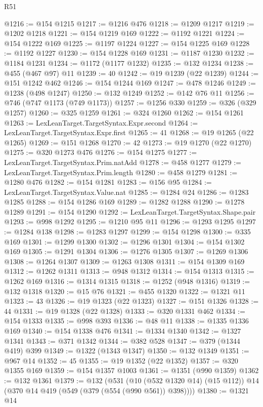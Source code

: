 \begin{lexlean}{R51}
\begin{coremodule}
@1216 := @154 @1215
@1217 := @1216 @476
@1218 := @1209 @1217
@1219 := @1202 @1218
@1221 := @154 @1219 @169
@1222 := @1192 @1221
@1224 := @154 @1222 @169
@1225 := @1197 @1224
@1227 := @154 @1225 @169
@1228 := @1192 @1227
@1230 := @154 @1228 @169
@1231 := @1187 @1230
@1232 := @1184 @1231
@1234 := @1172 (@1177 @1232)
@1235 := @132 @1234
@1238 := @455 (@467 @97) @11
@1239 := 40
@1242 := @19 @1239 (@22 @1239)
@1244 := @151 @1242 @462
@1246 := @154 @1244 @169
@1247 := @478 @1246
@1249 := @1238 (@498 @1247)
@1250 := @132 @1249
@1252 := @142 @76 @11
@1256 := @746 (@747 @1173 (@749 @1173))
@1257 := @1256 @330
@1259 := @326 (@329 @1257)
@1260 := @325 @1259
@1261 := @324 @1260
@1262 := @154 @1261
@1263 := LexLeanTarget.TargetSyntax.Expr.second
@1264 := LexLeanTarget.TargetSyntax.Expr.first
@1265 := 41
@1268 := @19 @1265 (@22 @1265)
@1269 := @151 @1268
@1270 := 42
@1273 := @19 @1270 (@22 @1270)
@1275 := @320 @1273 @476
@1276 := @154 @1275
@1277 := LexLeanTarget.TargetSyntax.Prim.natAdd
@1278 := @458 @1277
@1279 := LexLeanTarget.TargetSyntax.Prim.length
@1280 := @458 @1279
@1281 := @1280 @476
@1282 := @154 @1281
@1283 := @156 @95
@1284 := LexLeanTarget.TargetSyntax.Value.nat
@1285 := @1284 @24
@1286 := @1283 @1285
@1288 := @154 @1286 @169
@1289 := @1282 @1288
@1290 := @1278 @1289
@1291 := @154 @1290
@1292 := LexLeanTarget.TargetSyntax.Shape.pair
@1293 := @998 @1292
@1295 := @1210 @95 @11
@1296 := @1293 @1295
@1297 := @1284 @138
@1298 := @1283 @1297
@1299 := @154 @1298
@1300 := @335 @169
@1301 := @1299 @1300
@1302 := @1296 @1301
@1304 := @154 @1302 @169
@1305 := @1291 @1304
@1306 := @1276 @1305
@1307 := @1269 @1306
@1308 := @1264 @1307
@1309 := @1263 @1308
@1311 := @154 @1309 @169
@1312 := @1262 @1311
@1313 := @948 @1312
@1314 := @154 @1313
@1315 := @1262 @169
@1316 := @1314 @1315
@1318 := @1252 (@948 @1316)
@1319 := @132 @1318
@1320 := @15 @76
@1321 := @455 @1320
@1322 := @1321 @11
@1323 := 43
@1326 := @19 @1323 (@22 @1323)
@1327 := @151 @1326
@1328 := 44
@1331 := @19 @1328 (@22 @1328)
@1333 := @320 @1331 @462
@1334 := @154 @1333
@1335 := @998 @393
@1336 := @48 @11
@1338 := @1335 @1336 @169
@1340 := @154 @1338 @476
@1341 := @1334 @1340
@1342 := @1327 @1341
@1343 := @371 @1342
@1344 := @382 @528
@1347 := @379 (@1344 @419) @399
@1349 := @1322 (@1343 @1347)
@1350 := @132 @1349
@1351 := @967 @14
@1352 := 45
@1355 := @19 @1352 (@22 @1352)
@1357 := @320 @1355 @169
@1359 := @154 @1357 @1003
@1361 := @1351 (@990 @1359)
@1362 := @132 @1361
@1379 := @132
    (@531
      (@10 (@532 @1320 @14) (@15 @112))
      @14
      (@370 @14 @419 (@549 (@379 (@554 (@990 @561)) @398))))
@1380 := @1321 @14

\end{coremodule}
\end{lexlean}
